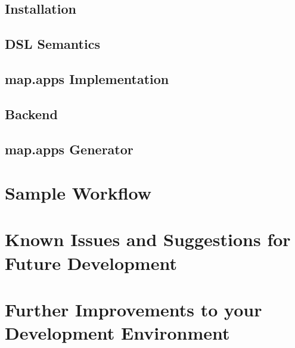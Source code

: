 \documentclass[a4paper, 12pt, titlepage, headsepline, listof = totoc, bibliography = totoc, numbers = noenddot]{scrbook} %
\begin{document}


\section{Installation}


\section{DSL Semantics}


\section{map.apps Implementation}


\section{Backend}\label{sec:backend}


\section{map.apps Generator}





\clearpage
\appendix
{}		%
%

\chapter{Sample Workflow}


\chapter{Known Issues and Suggestions for Future Development}


\chapter{Further Improvements to your Development Environment}

\end{document}
